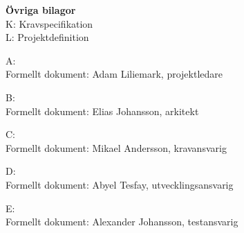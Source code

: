 \documentclass[conference]{IEEEtran}
\begin{document}
\textbf{Övriga bilagor}\\
K: Kravspecifikation\\
L: Projektdefinition

\newpage

\onecolumn

\begin{appendix}
    \begin{center}
        \large
        A:\\Formellt dokument: Adam Liliemark, projektledare
    \end{center}

    \clearpage
    
\end{appendix}

\begin{appendix}
    \begin{center}
        \large
        B:\\Formellt dokument: Elias Johansson, arkitekt
    \end{center}

    \clearpage
    
\end{appendix}

\begin{appendix}
    \begin{center}
        \large
        C:\\Formellt dokument: Mikael Andersson, kravansvarig
    \end{center}
    
    \clearpage
    
\end{appendix}

\begin{appendix}
    \begin{center}
        \large
        D:\\Formellt dokument: Abyel Tesfay, utvecklingsansvarig
    \end{center}

    \clearpage
    
\end{appendix}

\begin{appendix}
    \begin{center}
        \large
        E:\\Formellt dokument: Alexander Johansson, testansvarig
    \end{center}

    \clearpage
    
\end{appendix}
\end{document}

